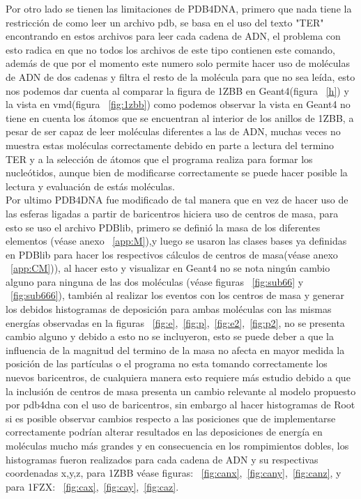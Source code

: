 Por otro lado se tienen las limitaciones de PDB4DNA, primero que nada tiene la restricción de como leer un archivo pdb, se basa en el uso del texto "TER" encontrando en estos archivos para leer cada cadena de ADN, el problema con esto radica en que no todos los archivos de este tipo contienen este comando, además de que por el momento este numero solo permite hacer uso de moléculas de ADN de dos cadenas y filtra el resto de la molécula para que no sea leída, esto nos podemos dar cuenta al comparar la figura de 1ZBB en Geant4(figura ~\ref{h}) y la vista en vmd(figura ~\ref{fig:1zbb}) como podemos observar la vista en Geant4 no tiene en cuenta los átomos que se encuentran al interior de los anillos de 1ZBB, a pesar de ser capaz de leer moléculas diferentes a las de ADN, muchas veces no muestra estas moléculas correctamente debido en parte a lectura del termino TER y a la selección de átomos que el programa realiza para formar los nucleótidos, aunque bien de modificarse correctamente se puede hacer posible la lectura y evaluación de estás moléculas.\\
Por ultimo PDB4DNA fue modificado de tal manera que en vez de hacer uso de las esferas ligadas a partir de baricentros hiciera uso de centros de masa, para esto se uso el archivo PDBlib, primero se definió la masa de los diferentes elementos (véase anexo ~\ref{app:M}),y luego se usaron las clases bases ya definidas en PDBlib para hacer los respectivos cálculos de centros de masa(véase anexo ~\ref{app:CM})), al hacer esto y visualizar en Geant4 no se nota ningún cambio alguno para ninguna de las dos moléculas (véase figuras ~\ref{fig:sub66} y ~\ref{fig:sub666}), también al realizar los eventos con los centros de masa y generar los debidos histogramas de deposición para ambas moléculas con las mismas energías observadas en la figuras ~\ref{fig:e},~\ref{fig:p},~\ref{fig:e2},~\ref{fig:p2}, no se presenta cambio alguno y debido a esto no se incluyeron, esto se puede deber a que la influencia de la magnitud del termino de la masa no afecta en mayor medida la posición de las partículas o el programa no esta tomando correctamente los nuevos baricentros, de cualquiera manera esto requiere más estudio debido a que la inclusión de centros de masa presenta un cambio relevante al modelo propuesto por pdb4dna con el uso de baricentros,  sin embargo al hacer histogramas de Root si es posible observar cambios respecto a las posiciones que de implementarse correctamente podrían alterar resultados en las deposiciones de energía en moléculas mucho más grandes y en consecuencia en los rompimientos dobles, los histogramas fueron realizados para cada cadena de ADN y su respectivas coordenadas x,y,z, para 1ZBB véase figuras: ~\ref{fig:canx},~\ref{fig:cany},~\ref{fig:canz}, y para 1FZX: ~\ref{fig:cax},~\ref{fig:cay},~\ref{fig:caz}.


